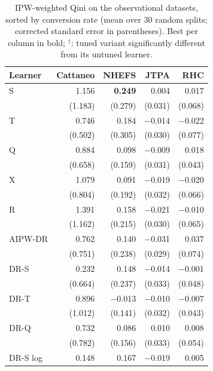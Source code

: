 \documentclass{article}
\begin{document}
\begin{table}[H]
\centering
\caption{IPW-weighted Qini on the observational datasets, sorted by
conversion rate (mean over $30$ random splits; corrected standard error in
parentheses). Best per column in bold; $^\dagger$: tuned variant
significantly different from its untuned learner.}
\label{tab:app-obs-qini}
\footnotesize
\setlength{\tabcolsep}{3pt}
\begin{tabular}{l|rrrr}
\hline
Learner & Cattaneo & NHEFS & JTPA & RHC \\
\hline
S & 1.156 & \textbf{0.249} & 0.004 & 0.017 \\
 & \scriptsize (1.183) & \scriptsize (0.279) & \scriptsize (0.031) & \scriptsize (0.068) \\[2pt]
T & 0.746 & 0.184 & $-$0.014 & $-$0.022 \\
 & \scriptsize (0.502) & \scriptsize (0.305) & \scriptsize (0.030) & \scriptsize (0.077) \\[2pt]
\hline
Q & 0.884 & 0.098 & $-$0.009 & 0.018 \\
 & \scriptsize (0.658) & \scriptsize (0.159) & \scriptsize (0.031) & \scriptsize (0.043) \\[2pt]
\hline
X & 1.079 & 0.091 & $-$0.019 & $-$0.020 \\
 & \scriptsize (0.804) & \scriptsize (0.192) & \scriptsize (0.032) & \scriptsize (0.066) \\[2pt]
R & 1.391 & 0.158 & $-$0.021 & $-$0.010 \\
 & \scriptsize (1.162) & \scriptsize (0.215) & \scriptsize (0.030) & \scriptsize (0.065) \\[2pt]
AIPW-DR & 0.762 & 0.140 & $-$0.031 & 0.037 \\
 & \scriptsize (0.751) & \scriptsize (0.238) & \scriptsize (0.029) & \scriptsize (0.074) \\[2pt]
\hline
DR-S & 0.232 & 0.148 & $-$0.014 & $-$0.001 \\
 & \scriptsize (0.664) & \scriptsize (0.237) & \scriptsize (0.033) & \scriptsize (0.048) \\[2pt]
DR-T & 0.896 & $-$0.013 & $-$0.010 & $-$0.007 \\
 & \scriptsize (1.012) & \scriptsize (0.141) & \scriptsize (0.032) & \scriptsize (0.043) \\[2pt]
DR-Q & 0.732 & 0.086 & 0.010 & 0.008 \\
 & \scriptsize (0.782) & \scriptsize (0.156) & \scriptsize (0.033) & \scriptsize (0.054) \\[2pt]
\hline
DR-S log & 0.148 & 0.167 & $-$0.019 & 0.005 \\

\end{tabular}
\end{table}
\end{document}
